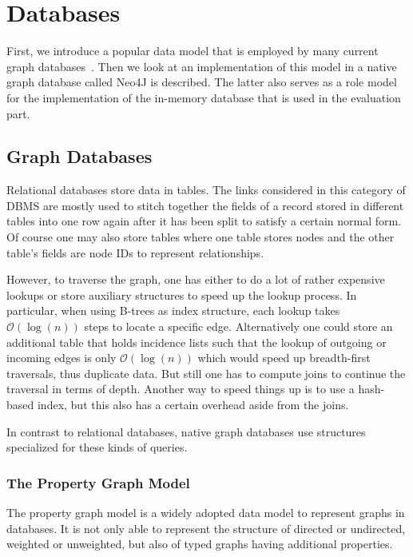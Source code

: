 \chapter{Databases}
    First, we introduce a popular data model that is employed by many current graph databases~\autocite{GitHubneo4j, ArangoDB, AmazonNeptune, RedisGraph}.
    Then we look at an implementation of this model in a native graph database called Neo4J is described. 
    The latter also serves as a role model for the implementation of the in-memory database that is used in the evaluation part.
                
\section{Graph Databases}
    Relational databases store data in tables.
    The links considered in this category of DBMS are mostly used to stitch together the fields of a record stored in different tables into one row again after it has been split to satisfy a certain normal form.
    Of course one may also store tables where one table stores nodes and the other table's fields are node IDs to represent relationships.

    However, to traverse the graph, one has either to do a lot of rather expensive lookups or store auxiliary structures to speed up the lookup process.
    In particular, when using B-trees as index structure, each lookup takes $\mathcal{O}(\log(n))$ steps to locate a specific edge.
    Alternatively one could store an additional table that holds incidence lists such that the lookup of outgoing or incoming edges is only $\mathcal{O}(\log(n))$ which would speed up breadth-first traversals, thus duplicate data.
    But still one has to compute joins to continue the traversal in terms of depth.
    Another way to speed things up is to use a hash-based index, but this also has a certain overhead aside from the joins.
    
    In contrast to relational databases, native graph databases use structures specialized for these kinds of queries.
            
    \subsection*{The Property Graph Model}\label{prop-graph-model}
        The property graph model is a widely adopted data model to represent graphs in databases.
        It is not only able to represent the structure of directed or undirected, weighted or unweighted, but also of typed graphs having additional properties.

